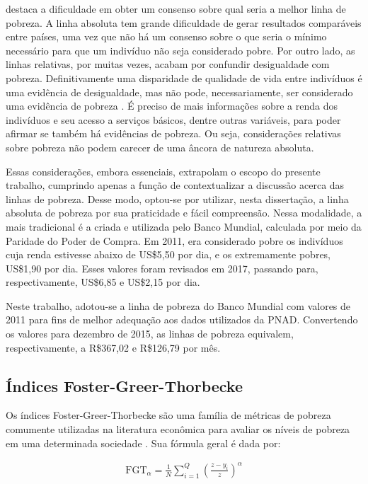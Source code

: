\textcite{soares09} destaca a dificuldade em obter um consenso sobre qual seria a melhor linha de pobreza. A linha absoluta tem grande dificuldade de gerar resultados comparáveis entre países, uma vez que não há um consenso sobre o que seria o mínimo necessário para que um indivíduo não seja considerado pobre. Por outro lado, as linhas relativas, por muitas vezes, acabam por confundir desigualdade com pobreza. Definitivamente uma disparidade de qualidade de vida entre indivíduos é uma evidência de desigualdade, mas não pode, necessariamente, ser considerado uma evidência de pobreza \cite{sen83}. É preciso de mais informações sobre a renda dos indivíduos e seu acesso a serviços básicos, dentre outras variáveis, para poder afirmar se também há evidências de pobreza. Ou seja, considerações relativas sobre pobreza não podem carecer de uma âncora de natureza absoluta.

Essas considerações, embora essenciais, extrapolam o escopo do presente trabalho, cumprindo apenas a função de contextualizar a discussão acerca das linhas de pobreza. Desse modo, optou-se por utilizar, nesta dissertação, a linha absoluta de pobreza por sua praticidade e fácil compreensão. Nessa modalidade, a mais tradicional é a criada e utilizada pelo Banco Mundial, calculada por meio da Paridade do Poder de Compra. Em 2011, era considerado pobre os indivíduos cuja renda estivesse abaixo de US\$5,50 por dia, e os extremamente pobres, US\$1,90 por dia. Esses valores foram revisados em 2017, passando para, respectivamente, US\$6,85 e US\$2,15 por dia.

Neste trabalho, adotou-se a linha de pobreza do Banco Mundial com valores de 2011 para fins de melhor adequação aos dados utilizados da PNAD. Convertendo os valores para dezembro de 2015, as linhas de pobreza equivalem, respectivamente, a R\$367,02 e R\$126,79 por mês. 


\subsection{Índices Foster-Greer-Thorbecke}

Os índices Foster-Greer-Thorbecke são uma família de métricas de pobreza comumente utilizadas na literatura econômica para avaliar os níveis de pobreza em uma determinada sociedade \cite{fgt84}. Sua fórmula geral é dada por:

\begin{align}
	\text{FGT}_\alpha = \frac{1}{N} \sum_{i=1}^{Q} \left( \frac{z - y_i}{z} \right)^{\alpha}
\end{align}

